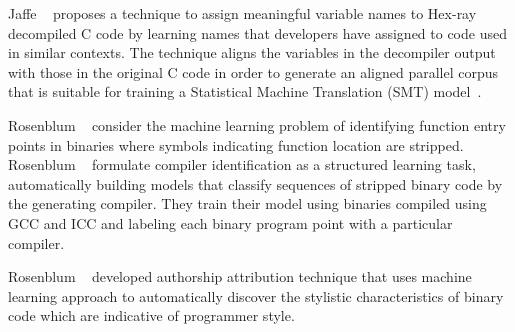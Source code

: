Jaffe \etal~\cite{Jaffe:2018ICPC} proposes a technique to assign meaningful
variable names to Hex-ray~\cite{hexray} decompiled C code by learning names
that developers have assigned to code used in similar contexts. The technique
aligns the variables in the decompiler output with those in the original C code
in order to generate an aligned parallel corpus that is suitable for training a
Statistical Machine Translation (SMT) model~\cite{Koehn:2007}.  

Rosenblum \etal~\cite{Rosenblum2007,Rosenblum:2008,Bao:2014,Shin:2015} consider
the machine learning problem of identifying function entry points in binaries
where symbols indicating function location are stripped.
%
Rosenblum \etal~\cite{Rosenblum:2010} formulate compiler identification as a
structured learning task, automatically building models that classify sequences
of stripped binary code by the generating compiler. They train their model
using binaries compiled using GCC and ICC and labeling each binary program
point with a particular compiler.
%

Rosenblum \etal~\cite{Rosenblum:2011} developed authorship attribution
technique that uses machine learning approach to automatically discover the
stylistic characteristics of binary code which are indicative of programmer
style.




